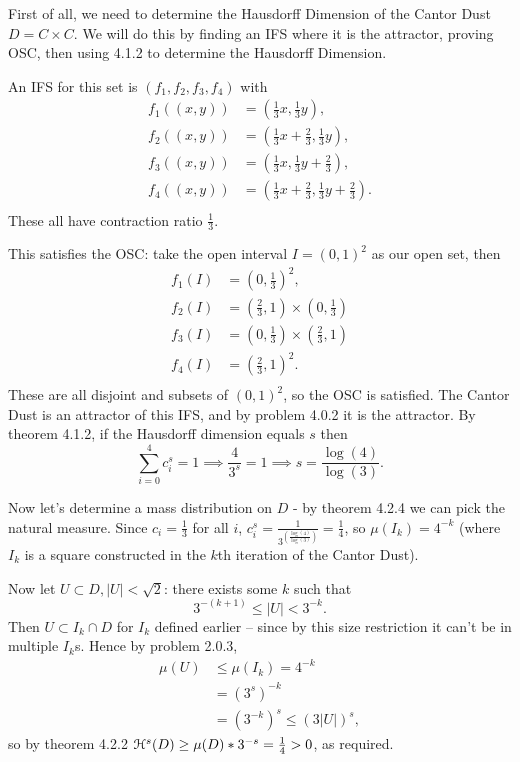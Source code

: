First of all, we need to determine the Hausdorff Dimension of the Cantor Dust \(D = C \times C\). We will do this by finding an IFS where it is the attractor, proving OSC, then using 4.1.2 to determine the Hausdorff Dimension.

An IFS for this set is \((f_1, f_2, f_3, f_4)\) with
\begin{align*}
    f_1((x, y)) &= \left(\frac{1}{3}x, \frac{1}{3}y\right),\\
    f_2((x, y)) &= \left(\frac{1}{3}x + \frac{2}{3}, \frac{1}{3}y\right),\\
    f_3((x, y)) &= \left(\frac{1}{3}x, \frac{1}{3}y + \frac{2}{3}\right),\\
    f_4((x, y)) &= \left(\frac{1}{3}x + \frac{2}{3}, \frac{1}{3}y + \frac{2}{3}\right).\\
\end{align*}
These all have contraction ratio \(\frac{1}{3}\).

This satisfies the OSC: take the open interval \(I = (0,1)^2\) as our open set, then 
\begin{align*}
    f_1(I) &= \left(0, \frac{1}{3}\right)^2,\\
    f_2(I) &= \left(\frac{2}{3}, 1\right)\times\left(0, \frac{1}{3}\right)\\
    f_3(I) &= \left(0, \frac{1}{3}\right)\times\left(\frac{2}{3}, 1\right)\\
    f_4(I) &= \left(\frac{2}{3}, 1\right)^2.\\
\end{align*}
These are all disjoint and subsets of \((0, 1)^2\), so the OSC is satisfied. The Cantor Dust is an attractor of this IFS, and by problem 4.0.2 it is the attractor. By theorem 4.1.2, if the Hausdorff dimension equals \(s\) then
\[\sum_{i = 0}^{4} c_i^s = 1 \implies \frac{4}{3^s} = 1 \implies s = \frac{\log(4)}{\log(3)}.\]

Now let's determine a mass distribution on \(D\) - by theorem 4.2.4 we can pick the natural measure. Since \(c_i = \frac{1}{3}\) for all \(i\), \(c_i^s = \frac{1}{3^{\left(\frac{\log(4)}{\log(3)}\right)}} = \frac{1}{4}\), so \(\mu(I_k) = 4^{-k}\) (where \(I_k\) is a square constructed in the \(k\)th iteration of the Cantor Dust).

Now let \(U \subset D, |U| < \sqrt{2}\): there exists some \(k\) such that
\[3^{-(k+1)} \leq |U| < 3^{-k}.\]
Then \(U \subset I_k \cap D\) for \(I_k\) defined earlier -- since by this size restriction it can't be in multiple \(I_k\)s. Hence by problem 2.0.3,
\begin{align*}
\mu(U) &\leq \mu(I_k) = 4^{-k}\\
&= (3^s)^{-k}\\
&= (3^{-k})^s \leq (3|U|)^s, 
\end{align*}
so by theorem 4.2.2 $\mathcal{H}^s(D) \geq \mu(D)*3^{-s} = \frac{1}{4} > 0$, as required.